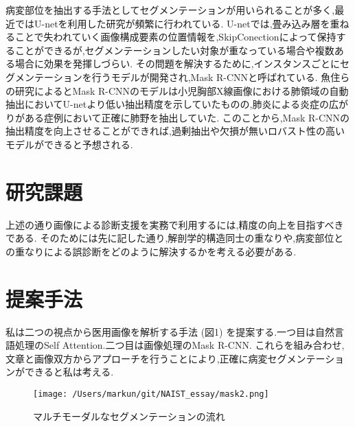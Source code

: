 \documentclass[a4j,10pt, twocolumn]{jarticle}
\begin{document}
病変部位を抽出する手法としてセグメンテーションが用いられることが多く,最近ではU-netを利用した研究が頻繁に行われている\cite{近藤堅司2018u}.
U-netでは,畳み込み層を重ねることで失われていく画像構成要素の位置情報を,SkipConectionによって保持することができるが,セグメンテーションしたい対象が重なっている場合や複数ある場合に効果を発揮しづらい.
その問題を解決するために,インスタンスごとにセグメンテーションを行うモデルが開発され,Mask R-CNNと呼ばれている\cite{he2017mask}.
魚住らの研究によるとMask R-CNNのモデルは小児胸部X線画像における肺領域の自動抽出においてU-netより低い抽出精度を示していたものの,肺炎による炎症の広がりがある症例において正確に肺野を抽出していた\cite{魚住春日2020mask}.
このことから,Mask R-CNNの抽出精度を向上させることができれば,過剰抽出や欠損が無いロバスト性の高いモデルができると予想される.

\section{研究課題}
上述の通り画像による診断支援を実務で利用するには,精度の向上を目指すべきである.
そのためには先に記した通り,解剖学的構造同士の重なりや,病変部位との重なりによる誤診断をどのように解決するかを考える必要がある.

\section{提案手法}
私は二つの視点から医用画像を解析する手法 (図1) を提案する.一つ目は自然言語処理のSelf Attention\cite{vaswani2017attention}.二つ目は画像処理のMask R-CNN.
これらを組み合わせ,文章と画像双方からアプローチを行うことにより,正確に病変セグメンテーションができると私は考える.

\begin{figure}[ht]%
    \texttt{[image: /Users/markun/git/NAIST\_essay/mask2.png]}
    \caption{マルチモーダルなセグメンテーションの流れ}
\end{figure}

\end{document}
